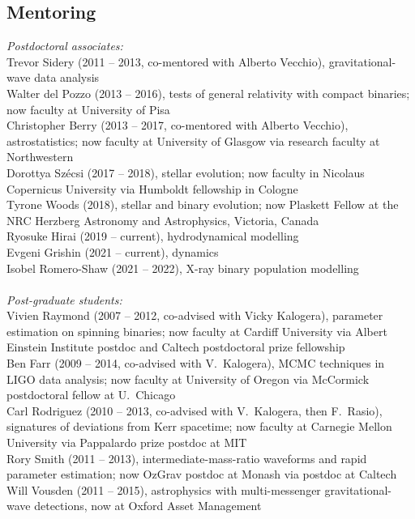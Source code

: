 \documentclass[margin,line]{res}
\begin{document}
\begin{resume}
\section{\sc Mentoring}
{\it Postdoctoral associates:}\\
Trevor Sidery (2011 -- 2013, co-mentored with Alberto Vecchio), gravitational-wave data analysis\\
Walter del Pozzo (2013 -- 2016), tests of general relativity with compact binaries; now faculty at University of Pisa\\
Christopher Berry (2013 -- 2017, co-mentored with Alberto Vecchio), astrostatistics; now faculty at University of Glasgow via research faculty at Northwestern\\
Dorottya Sz\'{e}csi (2017 -- 2018), stellar evolution; now faculty in Nicolaus Copernicus University via Humboldt fellowship in Cologne\\
Tyrone Woods (2018), stellar and binary evolution; now Plaskett Fellow at the NRC Herzberg Astronomy and Astrophysics, Victoria, Canada\\
Ryosuke Hirai (2019 -- current), hydrodynamical modelling\\
Evgeni Grishin (2021 -- current), dynamics\\
Isobel Romero-Shaw (2021 -- 2022), X-ray binary population modelling\\
\\
{\it Post-graduate students:}\\
Vivien Raymond (2007 -- 2012, co-advised with Vicky Kalogera), parameter estimation on spinning binaries; now faculty at Cardiff University via Albert Einstein Institute postdoc and Caltech postdoctoral prize fellowship\\
Ben Farr (2009 -- 2014, co-advised with V.~Kalogera), MCMC techniques in LIGO data analysis; now faculty at University of Oregon via McCormick postdoctoral fellow at U.~Chicago\\
Carl Rodriguez (2010 -- 2013, co-advised with V.~Kalogera, then F.~Rasio), signatures of deviations from Kerr spacetime; now faculty at Carnegie Mellon University via Pappalardo prize postdoc at MIT\\
Rory Smith (2011 -- 2013), intermediate-mass-ratio waveforms and rapid parameter estimation; now OzGrav postdoc at Monash via postdoc at Caltech\\
Will Vousden (2011 -- 2015), astrophysics with multi-messenger gravitational-wave detections, now at Oxford Asset Management\\

\end{resume}
\end{document}

